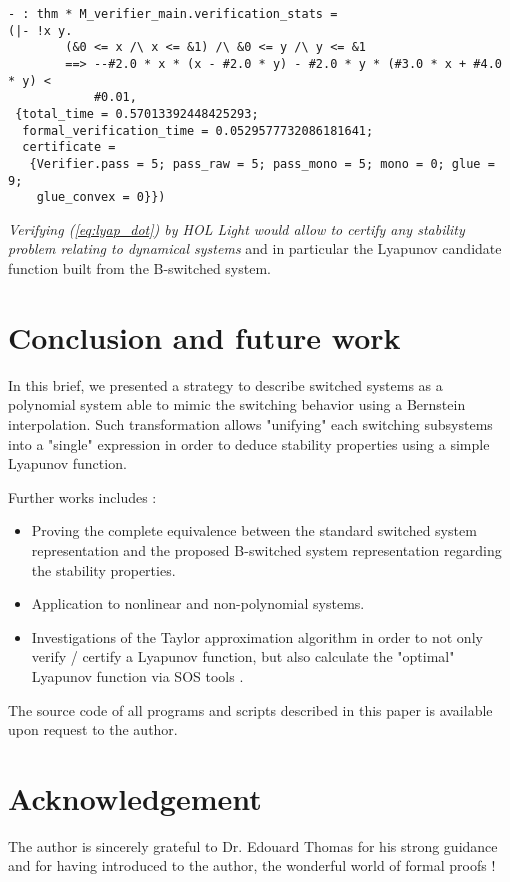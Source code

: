 \documentclass[12pt]{article}
\begin{document}
\begin{verbatim}
- : thm * M_verifier_main.verification_stats =
(|- !x y.
        (&0 <= x /\ x <= &1) /\ &0 <= y /\ y <= &1
        ==> --#2.0 * x * (x - #2.0 * y) - #2.0 * y * (#3.0 * x + #4.0 * y) <
            #0.01,
 {total_time = 0.57013392448425293;
  formal_verification_time = 0.0529577732086181641;
  certificate =
   {Verifier.pass = 5; pass_raw = 5; pass_mono = 5; mono = 0; glue = 9;
    glue_convex = 0}})
\end{verbatim}


{\it Verifying (\ref{eq:lyap_dot}) by HOL Light would allow to certify any stability problem relating to dynamical systems} and in particular the Lyapunov candidate 
function built from the B-switched system.

\section{Conclusion and future work}

In this brief, we presented a strategy to describe switched systems as a polynomial system able to mimic the switching behavior using a Bernstein interpolation. 
Such transformation allows "unifying" each switching subsystems into a "single" expression in order to deduce stability properties using a simple Lyapunov function.

Further works includes :
\begin{itemize}
 \item Proving the complete equivalence between the standard switched system representation and the proposed B-switched system representation regarding the stability properties.
 \item Application to nonlinear and non-polynomial systems.
 \item Investigations of the Taylor approximation algorithm in order to not only verify / certify a Lyapunov function, but also calculate the "optimal" Lyapunov function 
 via SOS tools \cite{SOS} \cite{Papa}. 
\end{itemize}
\noindent
The source code of all programs and scripts described in this paper is available upon request to the author.

\section*{Acknowledgement}

The author is sincerely grateful to Dr. Edouard Thomas for his strong guidance and for having introduced to the author, the wonderful world of formal proofs !
\end{document}
